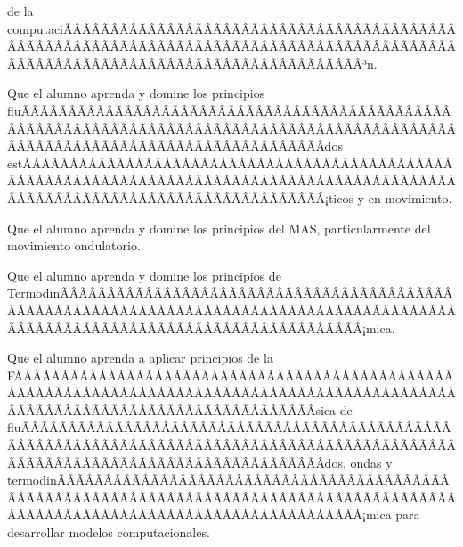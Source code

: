 \begin{sumilla}
\begin{fundamentacion}
de la computaciÃÂÃÂÃÂÃÂÃÂÃÂÃÂÃÂÃÂÃÂÃÂÃÂÃÂÃÂÃÂÃÂÃÂÃÂÃÂÃÂÃÂÃÂÃÂÃÂÃÂÃÂÃÂÃÂÃÂÃÂÃÂÃÂÃÂÃÂÃÂÃÂÃÂÃÂÃÂÃÂÃÂÃÂÃÂÃÂÃÂÃÂÃÂÃÂÃÂÃÂÃÂÃÂÃÂÃÂÃÂÃÂÃÂÃÂÃÂÃÂÃÂÃÂÃÂÃÂ³n.
\end{fundamentacion}

\begin{objetivosdelcurso}
\item  Que el alumno aprenda y domine los principios fluÃÂÃÂÃÂÃÂÃÂÃÂÃÂÃÂÃÂÃÂÃÂÃÂÃÂÃÂÃÂÃÂÃÂÃÂÃÂÃÂÃÂÃÂÃÂÃÂÃÂÃÂÃÂÃÂÃÂÃÂÃÂÃÂÃÂÃÂÃÂÃÂÃÂÃÂÃÂÃÂÃÂÃÂÃÂÃÂÃÂÃÂÃÂÃÂÃÂÃÂÃÂÃÂÃÂÃÂÃÂÃÂÃÂÃÂÃÂÃÂÃÂÃÂÃÂÃÂ­dos estÃÂÃÂÃÂÃÂÃÂÃÂÃÂÃÂÃÂÃÂÃÂÃÂÃÂÃÂÃÂÃÂÃÂÃÂÃÂÃÂÃÂÃÂÃÂÃÂÃÂÃÂÃÂÃÂÃÂÃÂÃÂÃÂÃÂÃÂÃÂÃÂÃÂÃÂÃÂÃÂÃÂÃÂÃÂÃÂÃÂÃÂÃÂÃÂÃÂÃÂÃÂÃÂÃÂÃÂÃÂÃÂÃÂÃÂÃÂÃÂÃÂÃÂÃÂÃÂ¡ticos y en movimiento.
\item  Que el alumno aprenda y domine los principios del MAS, particularmente del movimiento ondulatorio.
\item  Que el alumno aprenda y domine los principios de TermodinÃÂÃÂÃÂÃÂÃÂÃÂÃÂÃÂÃÂÃÂÃÂÃÂÃÂÃÂÃÂÃÂÃÂÃÂÃÂÃÂÃÂÃÂÃÂÃÂÃÂÃÂÃÂÃÂÃÂÃÂÃÂÃÂÃÂÃÂÃÂÃÂÃÂÃÂÃÂÃÂÃÂÃÂÃÂÃÂÃÂÃÂÃÂÃÂÃÂÃÂÃÂÃÂÃÂÃÂÃÂÃÂÃÂÃÂÃÂÃÂÃÂÃÂÃÂÃÂ¡mica.
\item  Que el alumno aprenda a aplicar principios de la FÃÂÃÂÃÂÃÂÃÂÃÂÃÂÃÂÃÂÃÂÃÂÃÂÃÂÃÂÃÂÃÂÃÂÃÂÃÂÃÂÃÂÃÂÃÂÃÂÃÂÃÂÃÂÃÂÃÂÃÂÃÂÃÂÃÂÃÂÃÂÃÂÃÂÃÂÃÂÃÂÃÂÃÂÃÂÃÂÃÂÃÂÃÂÃÂÃÂÃÂÃÂÃÂÃÂÃÂÃÂÃÂÃÂÃÂÃÂÃÂÃÂÃÂÃÂÃÂ­sica de fluÃÂÃÂÃÂÃÂÃÂÃÂÃÂÃÂÃÂÃÂÃÂÃÂÃÂÃÂÃÂÃÂÃÂÃÂÃÂÃÂÃÂÃÂÃÂÃÂÃÂÃÂÃÂÃÂÃÂÃÂÃÂÃÂÃÂÃÂÃÂÃÂÃÂÃÂÃÂÃÂÃÂÃÂÃÂÃÂÃÂÃÂÃÂÃÂÃÂÃÂÃÂÃÂÃÂÃÂÃÂÃÂÃÂÃÂÃÂÃÂÃÂÃÂÃÂÃÂ­dos, ondas y termodinÃÂÃÂÃÂÃÂÃÂÃÂÃÂÃÂÃÂÃÂÃÂÃÂÃÂÃÂÃÂÃÂÃÂÃÂÃÂÃÂÃÂÃÂÃÂÃÂÃÂÃÂÃÂÃÂÃÂÃÂÃÂÃÂÃÂÃÂÃÂÃÂÃÂÃÂÃÂÃÂÃÂÃÂÃÂÃÂÃÂÃÂÃÂÃÂÃÂÃÂÃÂÃÂÃÂÃÂÃÂÃÂÃÂÃÂÃÂÃÂÃÂÃÂÃÂÃÂ¡mica para desarrollar modelos computacionales.
\end{objetivosdelcurso}


\end{sumilla}
